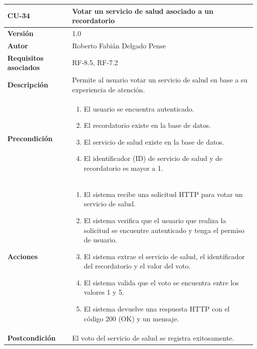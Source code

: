 \begin{table}[p]
	\centering
	\begin{tabularx}{\linewidth}{ p{} p{} }
		\toprule
		\textbf{CU-34}    & \textbf{Votar un servicio de salud asociado a un recordatorio}\\
		\toprule
		\textbf{Versión}              & 1.0    \\
		\textbf{Autor}                & Roberto Fabián Delgado Pense \\
		\textbf{Requisitos asociados} & RF-8.5, RF-7.2 \\ 
		\textbf{Descripción}          & Permite al usuario votar un servicio de salud en base a su experiencia de atención. \\
		\textbf{Precondición}         & 
  		\begin{enumerate}
			\def\labelenumi{\arabic{enumi}.}
			\tightlist
			\item El usuario se encuentra autenticado.
                \item El recordatorio existe en la base de datos.
                \item El servicio de salud existe en la base de datos.
                \item El identificador (ID) de servicio de salud y de recordatorio es mayor a 1.
            \end{enumerate}\\
		\textbf{Acciones}             &
		\begin{enumerate}
			\def\labelenumi{\arabic{enumi}.}
			\tightlist
			\item El sistema recibe una solicitud HTTP para votar un servicio de salud.
                \item El sistema verifica que el usuario que realiza la solicitud se encuentre autenticado y tenga el permiso de usuario.
			\item El sistema extrae el servicio de salud, el identificador del recordatorio y el valor del voto.
         	\item El sistema valida que el voto se encuentra entre los valores 1 y 5.
                \item El sistema devuelve una respuesta HTTP con el código 200 (OK) y un mensaje.
            \end{enumerate}\\
		\textbf{Postcondición}        & El voto del servicio de salud se registra exitosamente.\\

\end{tabularx}
\end{table}
